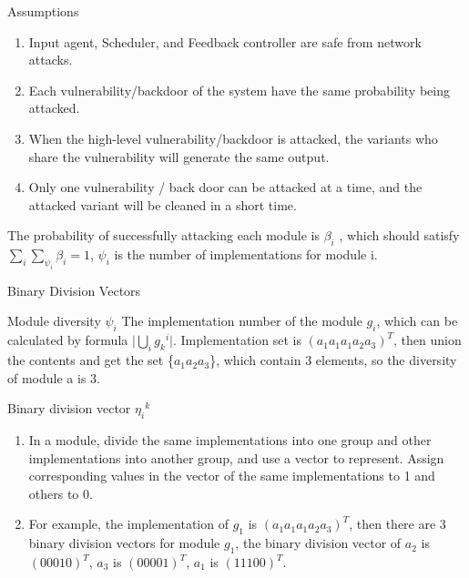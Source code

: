 \documentclass{beamer}
\begin{document}
\begin{frame}{Assumptions}
    \begin{block}{}
        \begin{enumerate}
            \item Input agent, Scheduler, and Feedback controller are safe from network attacks.
            \item Each vulnerability/backdoor of the system have the same probability being attacked.
            \item When the high-level vulnerability/backdoor is attacked, the variants who share the vulnerability will generate the same output.
            \item Only one vulnerability / back door can be attacked at a time, and the attacked variant will be cleaned in a short time.
        \end{enumerate}
    \end{block}
    The probability of successfully attacking each module is $\beta_i$ , which should satisfy $\sum_{i}\sum_{\psi_i} \beta_i = 1$, $\psi_i$ is the number of implementations for module i.
\end{frame}
\begin{frame}{Binary Division Vectors}
    \begin{block}{Module diversity  $\psi_i$}
        The implementation number of the module $g_i$, which can be calculated by formula $\lvert \bigcup\limits_{i}{g_k}^i \rvert$. Implementation set is $(a_1a_1a_1a_2a_3)^T$, then union the contents and get the set \{$a_1a_2a_3$\}, which contain 3 elements, so the diversity of module a is 3.
    \end{block}
    \begin{block}{Binary division vector ${\eta_{i}}^k$}
        \begin{enumerate}
            \item In a module, divide the same implementations into one group and other implementations into another group, and use a vector to represent. Assign corresponding values in the vector of the same implementations to 1 and others to 0.
            \item For example, the implementation of $g_{1}$ is ${(a_{1}a_{1}a_{1}a_{2}a_{3})^T}$, then there are 3 binary division vectors for module $g_1$, the binary division vector of $a_2$ is $(00010)^T$, $a_3$ is $(00001)^T$, $a_1$ is $(11100)^T$.
        \end{enumerate}
    \end{block}
\end{frame}
\end{document}
